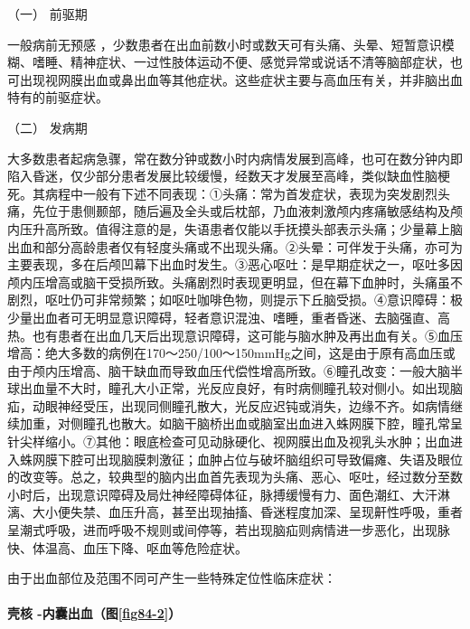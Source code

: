 \hypertarget{text00243.htmlux5cux23CHP8-1-3-2-1-1}{}
（一） 前驱期

一般病前无预感
，少数患者在出血前数小时或数天可有头痛、头晕、短暂意识模糊、嗜睡、精神症状、一过性肢体运动不便、感觉异常或说话不清等脑部症状，也可出现视网膜出血或鼻出血等其他症状。这些症状主要与高血压有关，并非脑出血特有的前驱症状。

\hypertarget{text00243.htmlux5cux23CHP8-1-3-2-1-2}{}
（二） 发病期

大多数患者起病急骤，常在数分钟或数小时内病情发展到高峰，也可在数分钟内即陷入昏迷，仅少部分患者发展比较缓慢，经数天才发展至高峰，类似缺血性脑梗死。其病程中一般有下述不同表现：①头痛：常为首发症状，表现为突发剧烈头痛，先位于患侧颞部，随后遍及全头或后枕部，乃血液刺激颅内疼痛敏感结构及颅内压升高所致。值得注意的是，失语患者仅能以手抚摸头部表示头痛；少量幕上脑出血和部分高龄患者仅有轻度头痛或不出现头痛。②头晕：可伴发于头痛，亦可为主要表现，多在后颅凹幕下出血时发生。③恶心呕吐：是早期症状之一，呕吐多因颅内压增高或脑干受损所致。头痛剧烈时表现更明显，但在幕下血肿时，头痛虽不剧烈，呕吐仍可非常频繁；如呕吐咖啡色物，则提示下丘脑受损。④意识障碍：极少量出血者可无明显意识障碍，轻者意识混浊、嗜睡，重者昏迷、去脑强直、高热。也有患者在出血几天后出现意识障碍，这可能与脑水肿及再出血有关。⑤血压增高：绝大多数的病例在170～250/100～150mmHg之间，这是由于原有高血压或由于颅内压增高、脑干缺血而导致血压代偿性增高所致。⑥瞳孔改变：一般大脑半球出血量不大时，瞳孔大小正常，光反应良好，有时病侧瞳孔较对侧小。如出现脑疝，动眼神经受压，出现同侧瞳孔散大，光反应迟钝或消失，边缘不齐。如病情继续加重，对侧瞳孔也散大。如脑干脑桥出血或脑室出血进入蛛网膜下腔，瞳孔常呈针尖样缩小。⑦其他：眼底检查可见动脉硬化、视网膜出血及视乳头水肿；出血进入蛛网膜下腔可出现脑膜刺激征；血肿占位与破坏脑组织可导致偏瘫、失语及眼位的改变等。总之，较典型的脑内出血首先表现为头痛、恶心、呕吐，经过数分至数小时后，出现意识障碍及局灶神经障碍体征，脉搏缓慢有力、面色潮红、大汗淋漓、大小便失禁、血压升高，甚至出现抽搐、昏迷程度加深、呈现鼾性呼吸，重者呈潮式呼吸，进而呼吸不规则或间停等，若出现脑疝则病情进一步恶化，出现脉快、体温高、血压下降、呕血等危险症状。

由于出血部位及范围不同可产生一些特殊定位性临床症状：

\paragraph{壳核 -内囊出血（图\ref{fig84-2}）}

